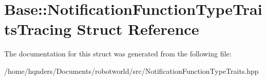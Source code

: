 \hypertarget{struct_base_1_1_notification_function_type_traits_tracing}{}\section{Base\+:\+:Notification\+Function\+Type\+Traits\+Tracing Struct Reference}
\label{struct_base_1_1_notification_function_type_traits_tracing}


The documentation for this struct was generated from the following file\+:\begin{DoxyCompactItemize}
\item 
/home/hqnders/\+Documents/robotworld/src/Notification\+Function\+Type\+Traits.\+hpp\end{DoxyCompactItemize}
